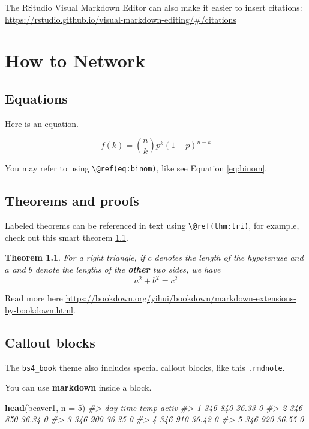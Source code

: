 \documentclass[
]{book}
\newenvironment{Shaded}{\begin{snugshade}}{\end{snugshade}}
\newcommand{\AttributeTok}[1]{\textcolor[rgb]{0.13,0.29,0.53}{#1}}
\newcommand{\CommentTok}[1]{\textcolor[rgb]{0.56,0.35,0.01}{\textit{#1}}}
\newcommand{\DecValTok}[1]{\textcolor[rgb]{0.00,0.00,0.81}{#1}}
\newcommand{\FunctionTok}[1]{\textcolor[rgb]{0.13,0.29,0.53}{\textbf{#1}}}
\newcommand{\NormalTok}[1]{#1}
\newtheorem{theorem}{Theorem}[chapter]
\theoremstyle{definition}
\theoremstyle{definition}
\theoremstyle{definition}
\theoremstyle{definition}
\theoremstyle{remark}
\begin{document}
The RStudio Visual Markdown Editor can also make it easier to insert citations: \url{https://rstudio.github.io/visual-markdown-editing/\#/citations}

\chapter{How to Network}\label{how-to-network}

\section{Equations}\label{equations}

Here is an equation.

\begin{equation} 
  f\left(k\right) = \binom{n}{k} p^k\left(1-p\right)^{n-k}
  \label{eq:binom}
\end{equation}

You may refer to using \texttt{\textbackslash{}@ref(eq:binom)}, like see Equation \eqref{eq:binom}.

\section{Theorems and proofs}\label{theorems-and-proofs}

Labeled theorems can be referenced in text using \texttt{\textbackslash{}@ref(thm:tri)}, for example, check out this smart theorem \ref{thm:tri}.

\begin{theorem}
\protect\hypertarget{thm:tri}{}\label{thm:tri}For a right triangle, if \(c\) denotes the \emph{length} of the hypotenuse
and \(a\) and \(b\) denote the lengths of the \textbf{other} two sides, we have
\[a^2 + b^2 = c^2\]
\end{theorem}

Read more here \url{https://bookdown.org/yihui/bookdown/markdown-extensions-by-bookdown.html}.

\section{Callout blocks}\label{callout-blocks}

The \texttt{bs4\_book} theme also includes special callout blocks, like this \texttt{.rmdnote}.

You can use \textbf{markdown} inside a block.

\begin{Shaded}
\begin{Highlighting}[]
\FunctionTok{head}\NormalTok{(beaver1, }\AttributeTok{n =} \DecValTok{5}\NormalTok{)}
\CommentTok{\#\textgreater{}   day time  temp activ}
\CommentTok{\#\textgreater{} 1 346  840 36.33     0}
\CommentTok{\#\textgreater{} 2 346  850 36.34     0}
\CommentTok{\#\textgreater{} 3 346  900 36.35     0}
\CommentTok{\#\textgreater{} 4 346  910 36.42     0}
\CommentTok{\#\textgreater{} 5 346  920 36.55     0}
\end{Highlighting}
\end{Shaded}
\end{document}
